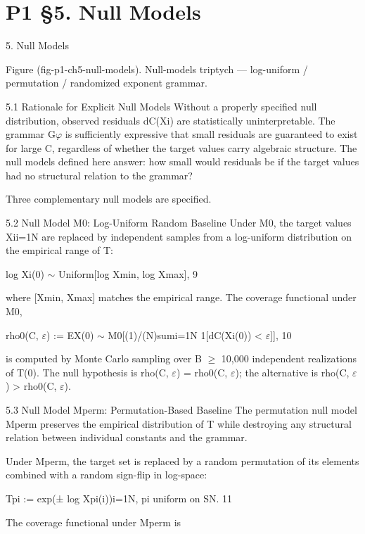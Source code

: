 
\section{P1 §5. Null Models}

5. Null Models

    Figure (fig-p1-ch5-null-models). Null-models triptych --- log-uniform / permutation / randomized
                                          exponent grammar.

  5.1 Rationale for Explicit Null Models
  Without a properly specified null distribution, observed residuals dC(Xi) are statistically
  uninterpretable. The grammar G$\varphi$ is sufficiently expressive that small residuals are
  guaranteed to exist for large C, regardless of whether the target values carry algebraic
  structure. The null models defined here answer: how small would residuals be if the
  target values had no structural relation to the grammar?

  Three complementary null models are specified.

  5.2 Null Model M0: Log-Uniform Random Baseline
  Under M0, the target values {Xi}i=1N are replaced by independent samples from a
  log-uniform distribution on the empirical range of T:

  log Xi(0) $\sim$ Uniform[log Xmin, log Xmax], 9

  where [Xmin, Xmax] matches the empirical range. The coverage functional under M0,

  rho0(C, $\varepsilon$) := EX(0) $\sim$ M0[(1)/(N)sumi=1N 1[dC(Xi(0)) < $\varepsilon$]], 10

  is computed by Monte Carlo sampling over B $\geq$ 10{,}000 independent realizations of
  T(0). The null hypothesis is rho(C, $\varepsilon$) = rho0(C, $\varepsilon$); the alternative is rho(C, $\varepsilon$) > rho0(C,
  $\varepsilon$).

  5.3 Null Model Mperm: Permutation-Based Baseline
  The permutation null model Mperm preserves the empirical distribution of T while
  destroying any structural relation between individual constants and the grammar.

  Under Mperm, the target set is replaced by a random permutation of its elements
  combined with a random sign-flip in log-space:

  Tpi := {exp(± log Xpi(i))}i=1N, pi uniform on SN. 11

  The coverage functional under Mperm is

